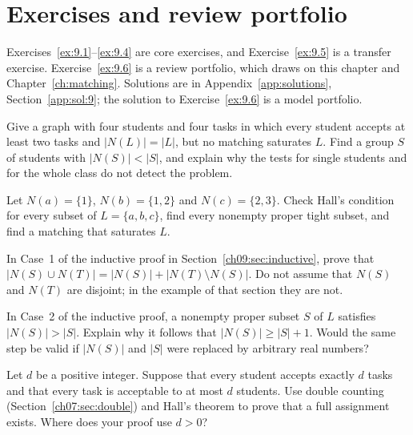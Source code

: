 \section*{Exercises and review portfolio}
Exercises~\ref{ex:9.1}--\ref{ex:9.4} are core exercises, and Exercise~\ref{ex:9.5} is a transfer exercise. Exercise~\ref{ex:9.6} is a review portfolio, which draws on this chapter and Chapter~\ref{ch:matching}. Solutions are in Appendix~\ref{app:solutions}, Section~\ref{app:sol:9}; the solution to Exercise~\ref{ex:9.6} is a model portfolio.
\begin{exercise}\label{ex:9.1}Give a graph with four students and four tasks in which every student accepts at least two tasks and $|N(L)|=|L|$, but no matching saturates $L$. Find a group $S$ of students with $|N(S)|<|S|$, and explain why the tests for single students and for the whole class do not detect the problem.\end{exercise}
\begin{exercise}\label{ex:9.2}Let $N(a)=\{1\}$, $N(b)=\{1,2\}$ and $N(c)=\{2,3\}$. Check Hall's condition for every subset of $L=\{a,b,c\}$, find every nonempty proper tight subset, and find a matching that saturates $L$.\end{exercise}
\begin{exercise}\label{ex:9.3}In Case~1 of the inductive proof in Section~\ref{ch09:sec:inductive}, prove that $|N(S)\cup N(T)|=|N(S)|+|N(T)\setminus N(S)|$. Do not assume that $N(S)$ and $N(T)$ are disjoint; in the example of that section they are not.\end{exercise}
\begin{exercise}\label{ex:9.4}In Case~2 of the inductive proof, a nonempty proper subset $S$ of $L$ satisfies $|N(S)|>|S|$. Explain why it follows that $|N(S)|\ge|S|+1$. Would the same step be valid if $|N(S)|$ and $|S|$ were replaced by arbitrary real numbers?\end{exercise}
\begin{exercise}\label{ex:9.5}Let $d$ be a positive integer. Suppose that every student accepts exactly $d$ tasks and that every task is acceptable to at most $d$ students. Use double counting (Section~\ref{ch07:sec:double}) and Hall's theorem to prove that a full assignment exists. Where does your proof use $d>0$?\end{exercise}
